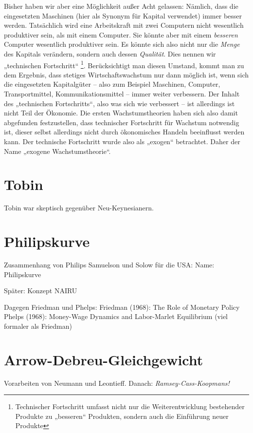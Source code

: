 Bisher haben wir aber eine Möglichkeit außer Acht gelassen: Nämlich, dass die eingesetzten Maschinen (hier als Synonym für Kapital verwendet) immer besser werden. Tatsächlich wird eine Arbeitskraft mit zwei Computern nicht wesentlich produktiver sein, als mit einem Computer. Sie könnte aber mit einem \textit{besseren} Computer wesentlich produktiver sein. Es könnte sich also nicht nur die \textit{Menge} des Kapitals verändern, sondern auch dessen \textit{Qualität}. Dies nennen wir „technischen Fortschritt“ \footnote{Technischer Fortschritt umfasst nicht nur die Weiterentwicklung bestehender Produkte zu „besseren“ Produkten, sondern auch die Einführung neuer Produkte}.
Berücksichtigt man diesen Umstand, kommt man zu dem Ergebnis, dass stetiges Wirtschaftswachstum nur dann möglich ist, wenn sich die eingesetzten Kapitalgüter – also zum Beispiel Maschinen, Computer, Transportmittel, Kommunikationsmittel – immer weiter verbessern.
Der Inhalt des „technischen Fortschritts“, also was sich wie verbessert – ist allerdings ist nicht Teil der Ökonomie. Die ersten Wachstumstheorien haben sich also damit abgefunden festzustellen, dass technischer Fortschritt für Wachstum notwendig ist, dieser selbst allerdings nicht durch ökonomisches Handeln beeinflusst werden kann. Der technische Fortschritt wurde also als „exogen“ betrachtet. Daher der Name „exogene Wachstumstheorie“.

\section{Tobin}

Tobin war skeptisch gegenüber Neu-Keynesianern. \textcite[S. 398]{Snowdon2005}

\section{Philipskurve} \label{sec: Phillips}

Zusammenhang von Philips
Samuelson und Solow für die USA: Name: Philipskurve


Später: Konzept NAIRU


Dagegen Friedman und Phelps:
Friedman (1968): The Role of Monetary Policy
Phelps (1968): Money-Wage Dynamics and Labor-Marlet Equilibrium (viel formaler als Friedman)








\section{Arrow-Debreu-Gleichgewicht}
Vorarbeiten von Neumann und Leontieff. Danach: \textit{Ramsey-Cass-Koopmans!}

